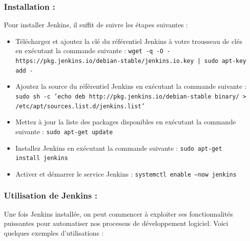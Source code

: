 \subsubsection*{Installation :}

Pour installer Jenkins, il suffit de suivre les étapes suivantes :

\begin{itemize}
\item Téléchargez et ajoutez la clé du référentiel Jenkins à votre trousseau de clés en exécutant la commande suivante :  
\texttt{wget -q -O - https://pkg.jenkins.io/debian-stable/jenkins.io.key | sudo apt-key add -}

\item Ajoutez la source du référentiel Jenkins en exécutant la commande suivante :  
\texttt{sudo sh -c 'echo deb http://pkg.jenkins.io/debian-stable binary/ > /etc/apt/sources.list.d/jenkins.list'}

\item Mettez à jour la liste des packages disponibles en exécutant la commande suivante :  
\texttt{sudo apt-get update}

\item Installez Jenkins en exécutant la commande suivante :  
\texttt{sudo apt-get install jenkins}

\item Activer et démarrer le service Jenkins :  
\texttt{systemctl enable --now jenkins}
\end{itemize}

\subsubsection*{Utilisation de Jenkins :}

Une fois Jenkins installée, on peut commencer à exploiter ses fonctionnalités puissantes pour automatiser nos processus de développement logiciel. Voici quelques exemples d’utilisations :

